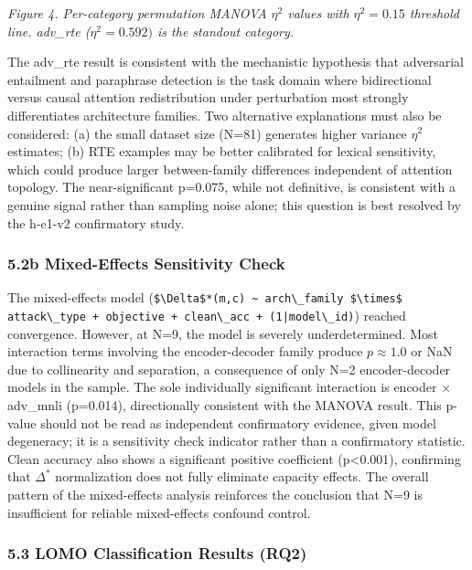\textit{Figure 4. Per-category permutation MANOVA $\eta^2$ values with $\eta^{2}=0.15$ threshold line. adv\_rte ($\eta^{2}=0.592)$ is the standout category.}

The adv\_rte result is consistent with the mechanistic hypothesis that adversarial entailment and paraphrase detection is the task domain where bidirectional versus causal attention redistribution under perturbation most strongly differentiates architecture families. Two alternative explanations must also be considered: (a) the small dataset size (N=81) generates higher variance $\eta^2$ estimates; (b) RTE examples may be better calibrated for lexical sensitivity, which could produce larger between-family differences independent of attention topology. The near-significant p=0.075, while not definitive, is consistent with a genuine signal rather than sampling noise alone; this question is best resolved by the h-e1-v2 confirmatory study.

\subsubsection{5.2b Mixed-Effects Sensitivity Check}

The mixed-effects model (\texttt{\$\textbackslash Delta\$*(m,c) \~{} arch\textbackslash \_family \$\textbackslash times\$ attack\textbackslash \_type + objective + clean\textbackslash \_acc + (1|model\textbackslash \_id)}) reached convergence. However, at N=9, the model is severely underdetermined. Most interaction terms involving the encoder-decoder family produce $p\approx 1.0$ or NaN due to collinearity and separation, a consequence of only N=2 encoder-decoder models in the sample. The sole individually significant interaction is encoder $\times$ adv\_mnli (p=0.014), directionally consistent with the MANOVA result. This p-value should not be read as independent confirmatory evidence, given model degeneracy; it is a sensitivity check indicator rather than a confirmatory statistic. Clean accuracy also shows a significant positive coefficient (p<0.001), confirming that $\Delta^*$ normalization does not fully eliminate capacity effects. The overall pattern of the mixed-effects analysis reinforces the conclusion that N=9 is insufficient for reliable mixed-effects confound control.

\subsubsection{5.3 LOMO Classification Results (RQ2)}


